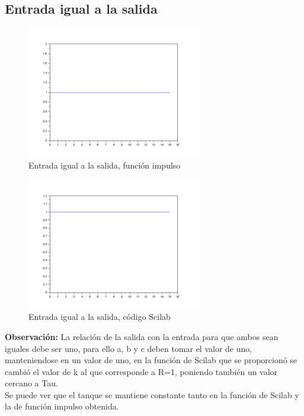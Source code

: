\documentclass[12pt,letterpaper]{article}     %
\begin{document}
\subsection{Entrada igual a la salida}
\begin{figure}[h!]
\centering
\includegraphics[width=3in]{1}
\caption{Entrada igual a la salida, función impulso}
\end{figure}
\begin{figure}[h!]
\centering
\includegraphics[width=3in]{4}
\caption{Entrada igual a la salida, código Scilab}
\end{figure}
\textbf{Observación:}
La relación de la salida con la entrada para que ambos sean iguales debe ser uno, para ello a, b y c deben tomar el valor de uno, manteniendose en un valor de uno, en la función de Scilab que se proporcionó se cambió el valor de k al que corresponde a  R=1, poniendo también un valor cercano a Tau.\\
Se puede ver que el tanque se mantiene constante tanto en la función de Scilab y la de función impulso obtenida.\\\\
\end{document}
